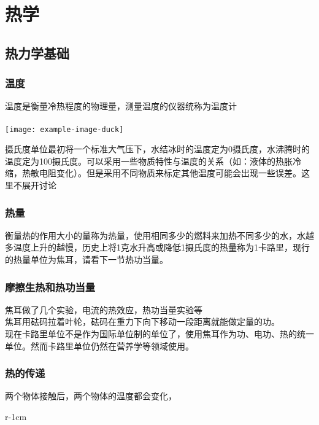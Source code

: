 \part{热学}
\chapter{热力学基础}
\section{温度}
温度是衡量冷热程度的物理量，测量温度的仪器统称为温度计 \\\\

\texttt{[image: example-image-duck]}

摄氏度单位最初将一个标准大气压下，水结冰时的温度定为0摄氏度，水沸腾时的温度定为100摄氏度。可以采用一些物质特性与温度的关系（如：液体的热胀冷缩，热敏电阻变化）。但是采用不同物质来标定其他温度可能会出现一些误差。这里不展开讨论

\section{热量}
衡量热的作用大小的量称为热量，使用相同多少的燃料来加热不同多少的水，水越多温度上升的越慢，历史上将1克水升高或降低1摄氏度的热量称为1卡路里，现行的热量单位为焦耳，请看下一节热功当量。

\section{摩擦生热和热功当量}
焦耳做了几个实验，电流的热效应，热功当量实验等 \\
焦耳用砝码拉着叶轮，砝码在重力下向下移动一段距离就能做定量的功。\\
现在卡路里单位不是作为国际单位制的单位了，使用焦耳作为功、电功、热的统一单位。然而卡路里单位仍然在营养学等领域使用。

\section{热的传递}
两个物体接触后，两个物体的温度都会变化，

\begin{wrapfigure}{r}{-1cm}
\end{wrapfigure}

